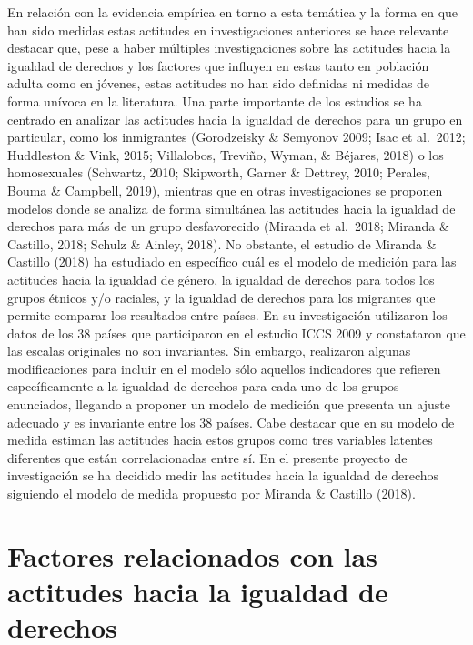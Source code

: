 \documentclass[12pt,twoside]{templates/facsothesis}
\begin{document}
En relación con la evidencia empírica en torno a esta temática y la forma en que han sido medidas estas actitudes en investigaciones anteriores se hace relevante destacar que, pese a haber múltiples investigaciones sobre las actitudes hacia la igualdad de derechos y los factores que influyen en estas tanto en población adulta como en jóvenes, estas actitudes no han sido definidas ni medidas de forma unívoca en la literatura. Una parte importante de los estudios se ha centrado en analizar las actitudes hacia la igualdad de derechos para un grupo en particular, como los inmigrantes (Gorodzeisky \& Semyonov 2009; Isac et al.~2012; Huddleston \& Vink, 2015; Villalobos, Treviño, Wyman, \& Béjares, 2018) o los homosexuales (Schwartz, 2010; Skipworth, Garner \& Dettrey, 2010; Perales, Bouma \& Campbell, 2019), mientras que en otras investigaciones se proponen modelos donde se analiza de forma simultánea las actitudes hacia la igualdad de derechos para más de un grupo desfavorecido (Miranda et al.~2018; Miranda \& Castillo, 2018; Schulz \& Ainley, 2018). No obstante, el estudio de Miranda \& Castillo (2018) ha estudiado en específico cuál es el modelo de medición para las actitudes hacia la igualdad de género, la igualdad de derechos para todos los grupos étnicos y/o raciales, y la igualdad de derechos para los migrantes que permite comparar los resultados entre países. En su investigación utilizaron los datos de los 38 países que participaron en el estudio ICCS 2009 y constataron que las escalas originales no son invariantes. Sin embargo, realizaron algunas modificaciones para incluir en el modelo sólo aquellos indicadores que refieren específicamente a la igualdad de derechos para cada uno de los grupos enunciados, llegando a proponer un modelo de medición que presenta un ajuste adecuado y es invariante entre los 38 países. Cabe destacar que en su modelo de medida estiman las actitudes hacia estos grupos como tres variables latentes diferentes que están correlacionadas entre sí. En el presente proyecto de investigación se ha decidido medir las actitudes hacia la igualdad de derechos siguiendo el modelo de medida propuesto por Miranda \& Castillo (2018).

\hypertarget{factores-relacionados-con-las-actitudes-hacia-la-igualdad-de-derechos}{%
\section{Factores relacionados con las actitudes hacia la igualdad de derechos}\label{factores-relacionados-con-las-actitudes-hacia-la-igualdad-de-derechos}}
\end{document}
